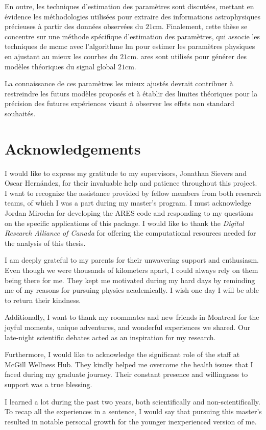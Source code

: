 \documentclass[12pt, TexShade, letterpaper]{report}
\begin{document}
En outre, les techniques d'estimation des paramètres sont discutées, mettant en évidence les méthodologies utilisées pour extraire des informations astrophysiques précieuses à partir des données observées du $\mathrm{21cm}$. Finalement, cette thèse se concentre sur une méthode spécifique d'estimation des paramètres, qui associe les techniques de \gls{mcmc} avec l'algorithme \gls{lm} pour estimer les paramètres physiques en ajustant au mieux les courbes du $\mathrm{21cm}$. \gls{ares} sont utilisés pour générer des modèles théoriques du signal global $\mathrm{21cm}$.\par

La connaissance de ces paramètres les mieux ajustés devrait contribuer à restreindre les futurs modèles proposés et à établir des limites théoriques pour la précision des futures expériences visant à observer les effets non standard souhaités.\par
\chapter*{Acknowledgements}
	\label{chap:acknowledgments}
I would like to express my gratitude to my supervisors, Jonathan Sievers and Oscar Hernández, for their invaluable help and patience throughout this project. I want to recognize the assistance provided by fellow members from both research teams, of which I was a part during my master's program. I must acknowledge Jordan Mirocha for developing the ARES code and responding to my questions on the specific applications of this package. I would like to thank the \emph{Digital Research Alliance of Canada} for offering the computational resources needed for the analysis of this thesis.\par
I am deeply grateful to my parents for their unwavering support and enthusiasm. Even though we were thousands of kilometers apart, I could always rely on them being there for me. They kept me motivated during my hard days by reminding me of my reasons for pursuing physics academically. I wish one day I will be able to return their kindness.\par
Additionally, I want to thank my roommates and new friends in Montreal for the joyful moments, unique adventures, and wonderful experiences we shared. Our late-night scientific debates acted as an inspiration for my research.\par
Furthermore, I would like to acknowledge the significant role of the staff at McGill Wellness Hub. They kindly helped me overcome the health issues that I faced during my graduate journey. Their constant presence and willingness to support was a true blessing.\par
I learned a lot during the past two years, both scientifically and non-scientifically. To recap all the experiences in a sentence, I would say that pursuing this master's resulted in notable personal growth for the younger inexperienced version of me.\par
\end{document}
